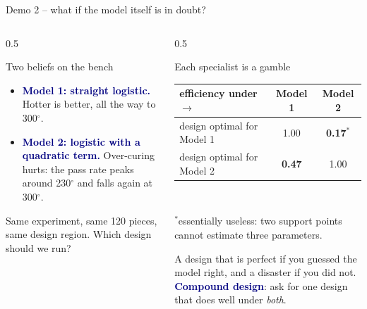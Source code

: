 \documentclass[aspectratio=169,10pt]{beamer}
\newcommand{\hl}[1]{\textcolor{brick}{\textbf{#1}}}
\newcommand{\key}[1]{\textcolor{navy}{\textbf{#1}}}
\begin{document}
\begin{frame}{Demo 2 -- what if the model itself is in doubt?}
  \small
  \begin{columns}[T]
    \begin{column}{0.5\textwidth}
      \begin{block}{Two beliefs on the bench}
        \begin{itemize}
          \item \key{Model 1: straight logistic.} Hotter is better, all the way to 300$^\circ$.
          \item \key{Model 2: logistic with a quadratic term.} Over-curing hurts: the pass rate peaks around 230$^\circ$ and
                falls again at 300$^\circ$.
        \end{itemize}
        Same experiment, same 120 pieces, same design region. Which design should we run?
      \end{block}
    \end{column}
    \begin{column}{0.5\textwidth}
      \begin{alertblock}{Each specialist is a gamble}
        \centering
        \begin{tabular}{lcc}\toprule
          efficiency under $\to$        & Model 1 & Model 2 \\ \midrule
          design optimal for Model 1     & 1.00 & \hl{0.17}$^*$ \\
          design optimal for Model 2     & \hl{0.47} & 1.00 \\ \bottomrule
        \end{tabular}\\[3pt]
        \raggedright\footnotesize $^*$essentially useless: two support points cannot estimate three parameters.
      \end{alertblock}
      A design that is perfect if you guessed the model right, and a disaster if you did not.
      \key{Compound design}: ask for one design that does well under \emph{both}.
    \end{column}
  \end{columns}
\end{frame}
\end{document}
